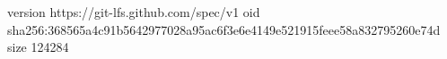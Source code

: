 version https://git-lfs.github.com/spec/v1
oid sha256:368565a4c91b5642977028a95ac6f3e6e4149e521915feee58a832795260e74d
size 124284
